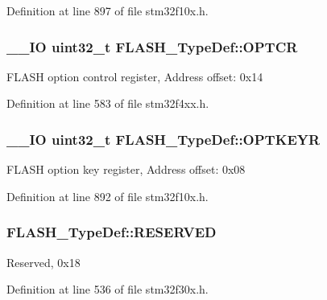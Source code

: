 Definition at line 897 of file stm32f10x.\-h.

\hypertarget{struct_f_l_a_s_h___type_def_a54026c3b5bc2059f1b187acb6c4817ac}{
\subsubsection[{O\-P\-T\-C\-R}]{\setlength{\rightskip}{0pt plus 5cm}\-\_\-\-\_\-\-I\-O {\bf uint32\-\_\-t} F\-L\-A\-S\-H\-\_\-\-Type\-Def\-::\-O\-P\-T\-C\-R}}\label{struct_f_l_a_s_h___type_def_a54026c3b5bc2059f1b187acb6c4817ac}
F\-L\-A\-S\-H option control register, Address offset\-: 0x14 

Definition at line 583 of file stm32f4xx.\-h.

\hypertarget{struct_f_l_a_s_h___type_def_a793cd13a4636c9785fdb99316f7fd7ab}{
\subsubsection[{O\-P\-T\-K\-E\-Y\-R}]{\setlength{\rightskip}{0pt plus 5cm}\-\_\-\-\_\-\-I\-O {\bf uint32\-\_\-t} F\-L\-A\-S\-H\-\_\-\-Type\-Def\-::\-O\-P\-T\-K\-E\-Y\-R}}\label{struct_f_l_a_s_h___type_def_a793cd13a4636c9785fdb99316f7fd7ab}
F\-L\-A\-S\-H option key register, Address offset\-: 0x08 

Definition at line 892 of file stm32f10x.\-h.

\hypertarget{struct_f_l_a_s_h___type_def_a0fcd52ab6fff5b2e6843ad029509913a}{
\subsubsection[{R\-E\-S\-E\-R\-V\-E\-D}]{ F\-L\-A\-S\-H\-\_\-\-Type\-Def\-::\-R\-E\-S\-E\-R\-V\-E\-D}}\label{struct_f_l_a_s_h___type_def_a0fcd52ab6fff5b2e6843ad029509913a}
Reserved, 0x18 

Definition at line 536 of file stm32f30x.\-h.


